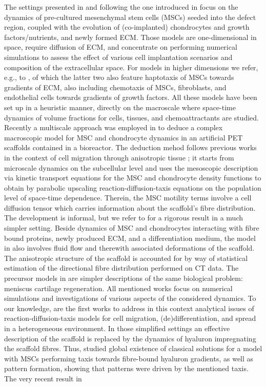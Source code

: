 \documentclass[a4paper,10pt]{article}
\theoremstyle{definition}
\begin{document}
 The settings presented in \cite{Campbell2019a,Campbell2019b} and following the one introduced in \cite{Lutianov2011} focus on the dynamics of pre-cultured mesenchymal stem cells (MSCs) seeded into the defect region, coupled with the evolution of (co-implanted) chondrocytes and growth factors/nutrients, and newly formed ECM. Those models are one-dimensional in space, require diffusion of ECM, and concentrate on performing numerical simulations to assess the effect of various cell implantation scenarios and composition of the extracellular space. For models in higher dimensions we refer, e.g., to \cite{andreykiv2008simulation,BAILONPLAZA2001,geris2008angiogenesis}, of which the latter two also feature haptotaxis of MSCs towards gradients of ECM, \cite{geris2008angiogenesis} also including chemotaxis of MSCs, fibroblasts, and endothelial cells towards gradients of growth factors. All these models have been set up in a heuristic manner, directly on the macroscale where space-time dynamics of volume fractions for cells, tissues, and chemoattractants are studied. Recently a multiscale approach was employed in \cite{surulescu_AMM} to deduce a complex macroscopic model for MSC and chondrocyte dynamics in an artificial PET scaffolds contained in a bioreactor. The deduction mehod follows previous works in the context of cell migration through anisotropic tissue  \cite{engwer2015glioma,engwer2016effective,conte2023mathematical,corbin2021modeling,Hillen2006}; it starts from microscale dynamics on the subcellular level and uses the mesoscopic description via kinetic transport equations for the MSC and chondrocyte density functions to obtain by parabolic upscaling reaction-diffusion-taxis equations on the population level of space-time dependence. Therein, the MSC motility terms involve a cell diffusion tensor which carries information about the scaffold's fibre distribution. The development is informal, but we refer to \cite{zhigun2022novel} for a rigorous result in a much  simpler setting. Beside dynamics of MSC and chondrocytes interacting with fibre bound proteins, newly produced ECM, and a differentiation medium, the model in \cite{surulescu_AMM} also involves fluid flow and therewith associated deformations of the scaffold. The anisotropic structure of the scaffold is accounted for by way of statistical estimation of the directional fibre distribution performed on CT data. The precursor models in \cite{Grosjean23,JaegerGrosjeanPlunderetal.2024} are simpler descriptions of the same biological problem: meniscus cartilage regeneration. All mentioned works focus on numerical simulations and investigations of various aspects of the considered dynamics. To our knowledge, \cite{Mohanan2025,Mohan2026} are the first works to address in this context analytical issues of reaction-diffusion-taxis models for cell migration, (de)differentiation, and spread in a heterogeneous environment. In those simplified settings an effective description of the scaffold is replaced by the dynamics of hyaluron impregnating the scaffold fibres. Thus, \cite{Mohanan2025} studied global existence of classical solutions for a model with MSCs performing taxis towards fibre-bound hyaluron gradients, as well as pattern formation, showing that patterns were driven by the mentioned taxis. The very recent result in 
\end{document}
